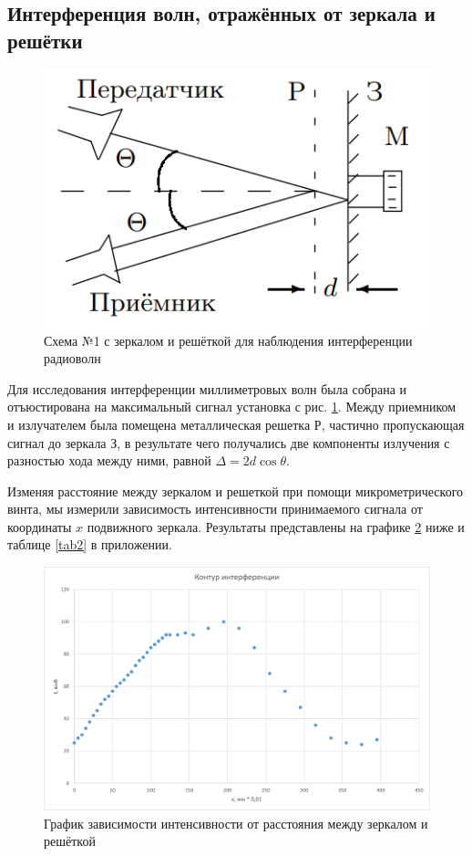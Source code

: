 \subsection{Интерференция волн, отражённых от зеркала и решётки}
\begin{figure}[H]
    \centering
    \includegraphics[scale=0.55]{pic/first_schema.png}
    \caption{Схема №1 с зеркалом и решёткой для наблюдения интерференции радиоволн}
    \label{fig:schema_1}
\end{figure}
Для исследования интерференции миллиметровых волн была собрана и отъюстирована на максимальный сигнал установка с рис. \ref{fig:schema_1}. Между приемником и излучателем была помещена металлическая решетка Р, частично пропускающая сигнал до зеркала З, в результате чего получались две компоненты излучения с разностью хода между ними, равной $\Delta = 2d\cos\theta$. 

Изменяя расстояние между зеркалом и решеткой при помощи микрометрического винта, мы измерили зависимость интенсивности принимаемого сигнала от координаты $x$ подвижного зеркала. Результаты представлены на графике \ref{fig:plot2} ниже и таблице \ref{tab2} в приложении. 

\begin{figure}[H]
    \centering
    \includegraphics[scale=0.7]{pic/plot2.png}
    \caption{График зависимости интенсивности от расстояния между зеркалом и решёткой}
    \label{fig:plot2}
\end{figure}

